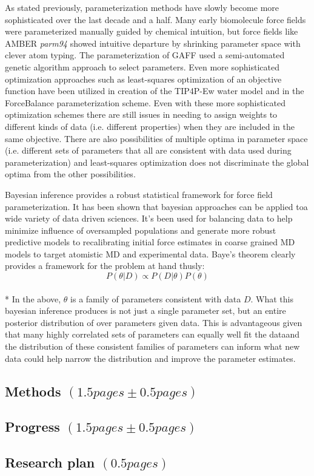 \documentclass[rmp,nofootinbib,superscriptaddress,12pt,tightenlines,notitlepage]{revtex4-1}
\begin{document}
As stated previously, parameterization methods have slowly become more sophisticated over the last decade and a half. Many early biomolecule force fields were parameterized manually guided by chemical intuition, but force fields like AMBER \textit{parm94} showed intuitive departure by shrinking parameter space with clever atom typing.\cite{parm94} The parameterization of GAFF used a semi-automated genetic algorithm approach to select parameters.\cite{amber} Even more sophisticated optimization approaches such as least-squares optimization of an objective function have been utilized in creation of the TIP4P-Ew water model\cite{tip4pew} and in the ForceBalance parameterization scheme\cite{FB1,FB2,FB3}. Even with these more sophisticated optimization schemes there are still issues in needing to assign weights to different kinds of data (i.e. different properties) when they are included in the same objective. There are also possibilities of multiple optima in parameter space (i.e. different sets of parameters that all are consistent with data used during parameterization) and least-squares optimization does not discriminate the global optima from the other possibilities.

Bayesian inference provides a robust statistical framework for force field parameterization. It has been shown that bayesian approaches can be applied toa wide variety of data driven sciences. It's been used for balancing data to help minimize influence of oversampled populations and generate more robust predictive models\cite{bayes_imbalance} to recalibrating initial force estimates in coarse grained MD models to target atomistic MD and experimental data\cite{bayes_coarse}. Baye's theorem clearly provides a framework for the problem at hand thusly:
\begin{equation} P\left(\theta|D\right) \propto P\left(D|\theta\right) P\left(\theta\right)\end{equation}\\*
In the above, $\theta$ is a family of parameters consistent with data $D$. What this bayesian inference produces is not just a single parameter set, but an entire posterior distribution of over parameters given data. This is advantageous given that many highly correlated sets of parameters can equally well fit the dataand the distribution of these consistent families of parameters can inform what new data could help narrow the distribution and improve the parameter estimates.

\subsection{Methods $\left(1.5 pages \pm 0.5 pages\right)$}

\subsection{Progress $\left(1.5 pages \pm 0.5 pages\right)$}

\subsection{Research plan $\left(0.5 pages\right)$}



\end{document}
